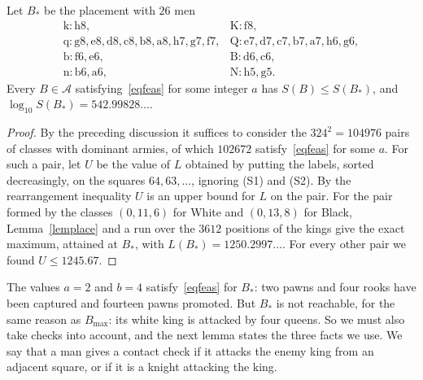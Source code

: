 \documentclass[12pt,reqno]{article}
\newcommand{\adm}{\mathcal{A}}
\newcommand{\sq}[1]{\mathrm{#1}}
\begin{document}
\begin{proposition}\label{propcap}
Let $B_{\ast}$ be the placement with $26$ men
\begin{displaymath}
\begin{array}{ll}
\sq{k}\colon \sq{h8}, & \sq{K}\colon \sq{f8},\\
\sq{q}\colon \sq{g8},\sq{e8},\sq{d8},\sq{c8},\sq{b8},\sq{a8},\sq{h7},\sq{g7},\sq{f7}, &
\sq{Q}\colon \sq{e7},\sq{d7},\sq{c7},\sq{b7},\sq{a7},\sq{h6},\sq{g6},\\
\sq{b}\colon \sq{f6},\sq{e6}, & \sq{B}\colon \sq{d6},\sq{c6},\\
\sq{n}\colon \sq{b6},\sq{a6}, & \sq{N}\colon \sq{h5},\sq{g5} .
\end{array}
\end{displaymath}
Every $B\in\adm$ satisfying~\eqref{eqfeas} for some integer $a$ has $S(B)\leq S(B_{\ast})$, and
$\log_{10}S(B_{\ast})=542.99828\ldots$.
\end{proposition}

\begin{proof}
By the preceding discussion it suffices to consider the $324^2=104976$ pairs of classes with
dominant armies, of which $102672$ satisfy~\eqref{eqfeas} for some $a$. For such a pair, let $U$
be the value of $L$ obtained by putting the labels, sorted decreasingly, on the squares
$64,63,\ldots$, ignoring (S1) and (S2). By the rearrangement inequality $U$ is an upper bound
for $L$ on the pair. For the pair formed by the classes $(0,11,6)$ for White and $(0,13,8)$ for
Black, Lemma~\ref{lemplace} and a run over the $3612$ positions of the kings give the exact
maximum, attained at $B_{\ast}$, with $L(B_{\ast})=1250.2997\ldots$. For every other pair we found
$U\leq 1245.67$.
\end{proof}

The values $a=2$ and $b=4$ satisfy~\eqref{eqfeas} for $B_{\ast}$: two pawns and four rooks have
been captured and fourteen pawns promoted. But $B_{\ast}$ is not reachable, for the same reason
as $B_{\max}$: its white king is attacked by four queens. So we must also take checks into account,
and the next lemma states the three facts we use. We say that a man gives a
contact check if it attacks the enemy king from an adjacent square, or if it is a knight
attacking the king.
\end{document}
